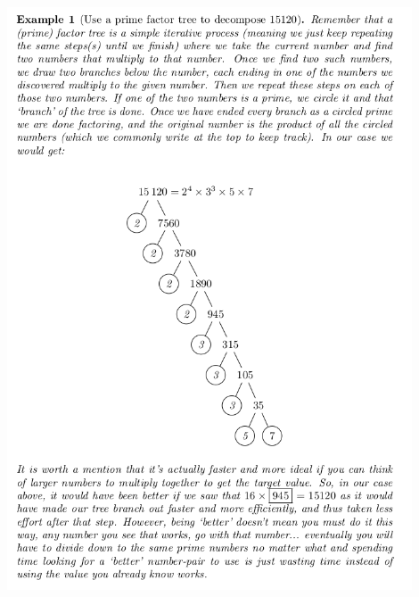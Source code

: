 \documentclass{ximera}
\begin{document}
        \begin{center}
        \includegraphics[width=0.9\textwidth]{Ex1PrimeFactorTree.png}
        \end{center}
\end{document}
